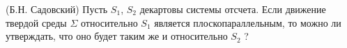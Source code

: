 (Б.Н. Садовский)
Пусть $S_{1}$, $S_{2}$  декартовы системы отсчета. Если движение твердой среды $\Sigma$
относительно $S_{1}$ является плоскопараллельным, то можно ли утверждать,
что оно будет таким же и относительно $S_{2}$ ?
